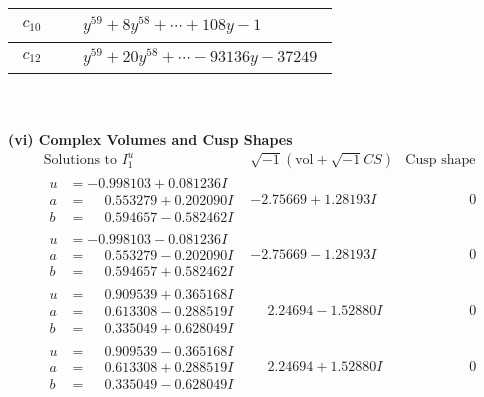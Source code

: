 \documentclass[1p]{elsarticle_modified}
\theoremstyle{definition}
\newcommand{\I}{\sqrt{-1}}
\begin{document}
\begin{tabular}{m{50pt}|m{274pt}}
\hline $$\begin{aligned}c_{10}\end{aligned}$$&$\begin{aligned}
&y^{59}+8 y^{58}+\cdots+108 y-1
\end{aligned}$\\
\hline $$\begin{aligned}c_{12}\end{aligned}$$&$\begin{aligned}
&y^{59}+20 y^{58}+\cdots-93136 y-37249
\end{aligned}$\\
\hline
\end{tabular}\\~\\
\newpage\flushleft \textbf{(vi) Complex Volumes and Cusp Shapes}
$$\begin{array}{c|c|c}  
\text{Solutions to }I^u_{1}& \I (\text{vol} + \sqrt{-1}CS) & \text{Cusp shape}\\
 \hline 
\begin{aligned}
u &= -0.998103 + 0.081236 I \\
a &= \phantom{-}0.553279 + 0.202090 I \\
b &= \phantom{-}0.594657 - 0.582462 I\end{aligned}
 & -2.75669 + 1.28193 I & \phantom{-0.000000 } 0 \\ \hline\begin{aligned}
u &= -0.998103 - 0.081236 I \\
a &= \phantom{-}0.553279 - 0.202090 I \\
b &= \phantom{-}0.594657 + 0.582462 I\end{aligned}
 & -2.75669 - 1.28193 I & \phantom{-0.000000 } 0 \\ \hline\begin{aligned}
u &= \phantom{-}0.909539 + 0.365168 I \\
a &= \phantom{-}0.613308 - 0.288519 I \\
b &= \phantom{-}0.335049 + 0.628049 I\end{aligned}
 & \phantom{-}2.24694 - 1.52880 I & \phantom{-0.000000 } 0 \\ \hline\begin{aligned}
u &= \phantom{-}0.909539 - 0.365168 I \\
a &= \phantom{-}0.613308 + 0.288519 I \\
b &= \phantom{-}0.335049 - 0.628049 I\end{aligned}
 & \phantom{-}2.24694 + 1.52880 I & \phantom{-0.000000 } 0 \\ \hline\begin{aligned}

\end{aligned}
\end{array}$$
\end{document}
